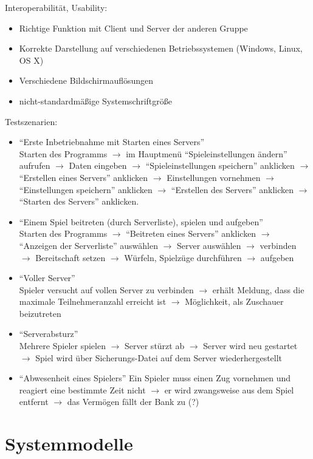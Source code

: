 \documentclass[a4paper,10pt]{article}
\begin{document}
Interoperabilität, Usability:
\begin{itemize}
\item Richtige Funktion mit Client und Server der anderen Gruppe
\item Korrekte Darstellung auf verschiedenen Betriebssystemen (Windows, Linux, OS X)
\item Verschiedene Bildschirmauflösungen
\item nicht-standardmäßige Systemschriftgröße
\end{itemize}
Testszenarien:
\begin{itemize}
\item ``Erste Inbetriebnahme mit Starten eines Servers'' \\
Starten des Programms $\rightarrow$ im Hauptmenü ``Spieleinstellungen ändern'' aufrufen $\rightarrow$ Daten eingeben $\rightarrow$ ``Spieleinstellungen speichern'' anklicken $\rightarrow$ ``Erstellen eines Servers'' anklicken $\rightarrow$ Einstellungen vornehmen $\rightarrow$ ``Einstellungen speichern'' anklicken $\rightarrow$ ``Erstellen des Servers'' anklicken $\rightarrow$ ``Starten des Servers'' anklicken.
\item ``Einem Spiel beitreten (durch Serverliste), spielen und aufgeben'' \\
Starten des Programms $\rightarrow$ ``Beitreten eines Servers'' anklicken $\rightarrow$ ``Anzeigen der Serverliste'' auswählen $\rightarrow$ Server auswählen $\rightarrow$ verbinden $\rightarrow$ Bereitschaft setzen $\rightarrow$ Würfeln, Spielzüge durchführen $\rightarrow$ aufgeben
\item ``Voller Server'' \\
Spieler versucht auf vollen Server zu verbinden $\rightarrow$ erhält Meldung, dass die maximale Teilnehmeranzahl erreicht ist $\rightarrow$ Möglichkeit, als Zuschauer beizutreten
\item ``Serverabsturz'' \\
Mehrere Spieler spielen $\rightarrow$ Server stürzt ab $\rightarrow$ Server wird neu gestartet $\rightarrow$ Spiel wird über Sicherungs-Datei auf dem Server wiederhergestellt
\item ``Abwesenheit eines Spielers''
Ein Spieler muss einen Zug vornehmen und reagiert eine bestimmte Zeit nicht $\rightarrow$ er wird zwangsweise aus dem Spiel entfernt $\rightarrow$ das Vermögen fällt der Bank zu (?)
\end{itemize}

\section{Systemmodelle}
\end{document}
